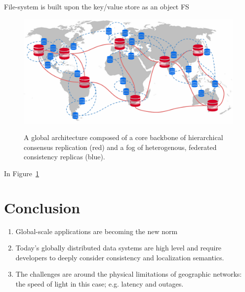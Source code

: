 File-system is built upon the key/value store as an object FS

\begin{figure}
    \begin{center}
        \includegraphics[width=5in]{figures/ch02_global_architecture.pdf}
    \end{center}
    \renewcommand{\baselinestretch}{1}
    \small\normalsize

    \begin{quote}
        \caption[Global Architecture]{A global architecture composed of a core backbone of hierarchical consensus replication (red) and a fog of heterogenous, federated consistency replicas (blue).}
        \label{fig:ch02_global_architecture}
    \end{quote}
\end{figure}
\renewcommand{\baselinestretch}{2}
\small\normalsize

In Figure~\ref{fig:ch02_global_architecture}

\section{Conclusion}

\begin{enumerate}
    \item Global-scale applications are becoming the new norm
    \item Today's globally distributed data systems are high level and require developers to deeply consider consistency and localization semantics.
    \item The challenges are around the physical limitations of geographic networks: the speed of light in this case; e.g. latency and outages.

\end{enumerate}
